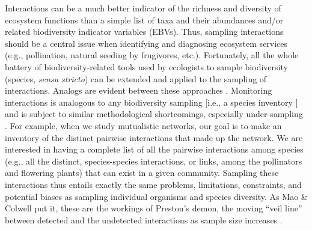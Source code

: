 \documentclass[12pt]{article}
\begin{document}
Interactions can be a much better indicator of the richness and diversity of ecosystem functions than a simple list of taxa and their abundances and\slash or related biodiversity indicator variables (EBVs). Thus, sampling interactions should be a central issue when identifying and diagnosing ecosystem services (e.g., pollination, natural seeding by frugivores, etc.). Fortunately, all the whole battery of biodiversity-related tools used by ecologists to sample biodiversity (species, \emph{sensu stricto}) can be extended and applied to the sampling of interactions. Analogs are evident between these approaches \citep{Colwell:2012fc}. Monitoring interactions is analogous to any biodiversity sampling [i.e., a species inventory \citet{E31/2562,Jordano:2009c}] and is subject to similar methodological shortcomings, especially under-sampling \citep{Coddington:2009fi,Vazquez:2009p82,Dorado:2011cf,RiveraHutinel:2012vn}. For example, when we study mutualistic networks, our goal is to make an inventory of the distinct pairwise interactions that made up the network. We are interested in having a complete list of all the pairwise interactions among species (e.g., all the distinct, species-species interactions, or links, among the pollinators and flowering plants) that can exist in a given community. Sampling these interactions thus entails exactly the same problems, limitations, constraints, and potential biases as sampling individual organisms and species diversity. As Mao \& Colwell \citeyearpar{Mao:2005tka} put it, these are the workings of Preston’s demon, the moving ``veil line'' between detected and the undetected interactions as sample size increases \citep{E2/813}.
\end{document}

